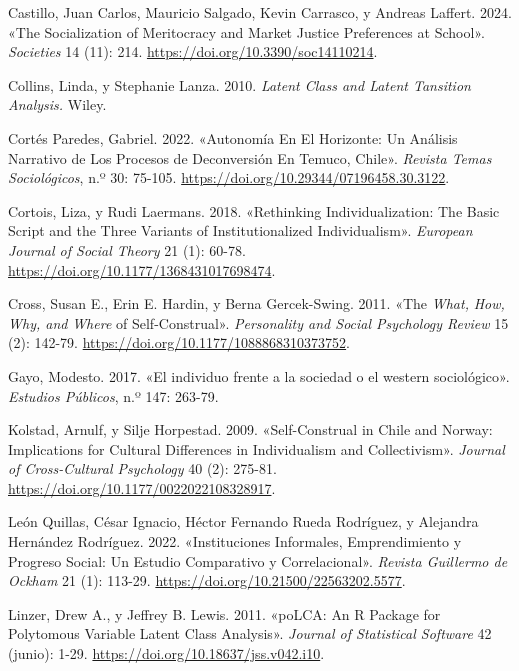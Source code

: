 \documentclass[
  letterpaper,
  DIV=11,
  numbers=noendperiod]{scrartcl}
\newlength{\cslhangindent}
\newenvironment{CSLReferences}[2] %
 {\begin{list}{}{%
  \setlength{\itemindent}{0pt}
  \setlength{\leftmargin}{0pt}
  \setlength{\parsep}{0pt}
  \ifodd #1
   \setlength{\leftmargin}{\cslhangindent}
   \setlength{\itemindent}{-1\cslhangindent}
  \fi
  \setlength{\itemsep}{#2\baselineskip}}}
 {\end{list}}
\begin{document}
\begin{CSLReferences}{1}{0}
Castillo, Juan Carlos, Mauricio Salgado, Kevin Carrasco, y Andreas
Laffert. 2024. {«The {Socialization} of {Meritocracy} and {Market
Justice Preferences} at {School}»}. \emph{Societies} 14 (11): 214.
\url{https://doi.org/10.3390/soc14110214}.

Collins, Linda, y Stephanie Lanza. 2010. \emph{Latent Class and Latent
Tansition Analysis.} Wiley.

Cortés Paredes, Gabriel. 2022. {«Autonom{í}a En El Horizonte: Un
An{á}lisis Narrativo de Los Procesos de Deconversi{ó}n En {Temuco},
{Chile}»}. \emph{Revista Temas Sociol{ó}gicos}, n.º 30: 75-105.
\url{https://doi.org/10.29344/07196458.30.3122}.

Cortois, Liza, y Rudi Laermans. 2018. {«Rethinking Individualization:
{The} Basic Script and the Three Variants of Institutionalized
Individualism»}. \emph{European Journal of Social Theory} 21 (1): 60-78.
\url{https://doi.org/10.1177/1368431017698474}.

Cross, Susan E., Erin E. Hardin, y Berna Gercek-Swing. 2011. {«The
{\emph{What}}{\emph{,} }{\emph{How}}{\emph{,} }{\emph{Why}}{\emph{, and}
}{\emph{Where}} of {Self-Construal}»}. \emph{Personality and Social
Psychology Review} 15 (2): 142-79.
\url{https://doi.org/10.1177/1088868310373752}.

Gayo, Modesto. 2017. {«{El individuo frente a la sociedad o el western
sociol{ó}gico}»}. \emph{Estudios P{ú}blicos}, n.º 147: 263-79.

Kolstad, Arnulf, y Silje Horpestad. 2009. {«Self-{Construal} in {Chile}
and {Norway}: {Implications} for {Cultural Differences} in
{Individualism} and {Collectivism}»}. \emph{Journal of Cross-Cultural
Psychology} 40 (2): 275-81.
\url{https://doi.org/10.1177/0022022108328917}.

León Quillas, César Ignacio, Héctor Fernando Rueda Rodríguez, y
Alejandra Hernández Rodríguez. 2022. {«Instituciones Informales,
Emprendimiento y Progreso Social: Un Estudio Comparativo y
Correlacional»}. \emph{Revista Guillermo de Ockham} 21 (1): 113-29.
\url{https://doi.org/10.21500/22563202.5577}.

Linzer, Drew A., y Jeffrey B. Lewis. 2011. {«{poLCA}: {An R Package} for
{Polytomous Variable Latent Class Analysis}»}. \emph{Journal of
Statistical Software} 42 (junio): 1-29.
\url{https://doi.org/10.18637/jss.v042.i10}.


\end{CSLReferences}
\end{document}
